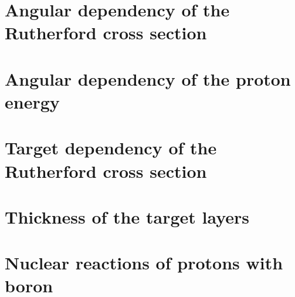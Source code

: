 \section{Angular dependency of the Rutherford cross section}

\section{Angular dependency of the proton energy}

\section{Target dependency of the Rutherford cross section}

\section{Thickness of the target layers} 

\section{Nuclear reactions of protons with boron}

